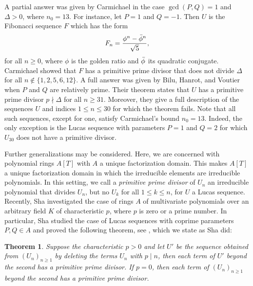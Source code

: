 \documentclass[reqno]{amsart}
\newtheorem{theorem}{Theorem}
\begin{document}
A partial answer was given by Carmichael \cite{Ca} in the case $\gcd(P,Q)=1$ and $\Delta> 0$, where $n_0=13$. For instance, let $P=1$ and $Q=-1$. Then $U$ is the Fibonacci sequence $F$ which has the form
\[
F_n = \frac{\phi^n-\Bar{\phi}^n}{\sqrt{5}},
\]
for all $n\geq 0$, where $\phi$ is the golden ratio and $\Bar{\phi}$ its quadratic conjugate. Carmichael showed that $F$ has a primitive prime divisor that does not divide $\Delta$ for all $n\not \in \{1,2,5,6,12\}$. A full answer was given by Bilu, Hanrot, and Voutier \cite{BHV} when $P$ and $Q$ are relatively prime. Their theorem states that $U$ has a primitive prime divisor $p\nmid \Delta$ for all $n\geq 31$. Moreover, they give a full description of the sequences $U$ and indices $1\leq n \leq 30$ for which the theorem fails. Note that all such sequences, except for one, satisfy Carmichael's bound $n_0=13$. Indeed, the only exception is the Lucas sequence with parameters $P=1$ and $Q=2$ for which $U_{30}$ does not have a primitive divisor.

Further generalizations may be considered. Here, we are concerned with polynomial rings $A[T]$ with $A$ a unique factorization domain. This makes $A[T]$ a unique factorization domain in which the irreducible elements are irreducible polynomials. In this setting, we call a {\it primitive prime divisor} of $U_n$ an irreducible polynomial that divides $U_n$, but no $U_k$ for all $1\leq k \leq n$, for $U$ a Lucas sequence. Recently, Sha \cite{Sha} investigated the case of rings $A$ of multivariate polynomials over an arbitrary field $K$ of characteristic $p$, where $p$ is zero or a prime number. In particular, Sha studied the case of Lucas sequences with coprime parameters $P,Q\in A$ and proved the following theorem, see \cite[Theorem 1.4]{Sha}, which we state as Sha did:
\begin{theorem}\label{Sha's Theorem}
    Suppose the characteristic $p > 0$ and let $U'$ be the sequence obtained from $(U_n)_{n\geq 1} $ by deleting the terms $U_n$ with $p\mid n$, then each term of $U'$ beyond the second has a primitive prime divisor. If $p = 0$, then each term of $(U_n)_{n\geq 1} $ beyond the second has a primitive prime divisor.
\end{theorem}
\end{document}
